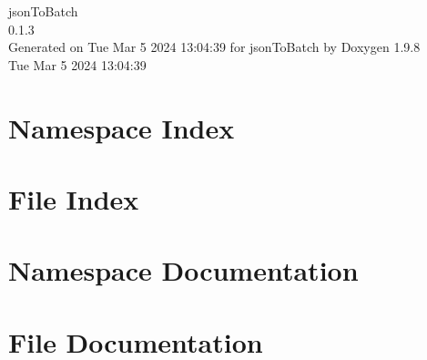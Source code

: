 \documentclass[twoside]{book}
\newcommand{\+}{\discretionary{\mbox{\scriptsize$\hookleftarrow$}}{}{}}
\newcommand{\clearemptydoublepage}{%
    \newpage{\pagestyle{empty}\cleardoublepage}%
  }
\begin{document}
  \raggedbottom
    \hypersetup{pageanchor=false,
                bookmarksnumbered=true,
                pdfencoding=unicode
               }
  \begin{titlepage}
  \vspace*{7cm}
  \begin{center}%
  {\Large json\+To\+Batch}\\
  [1ex]\large 0.\+1.\+3 \\
  \vspace*{1cm}
  {\large Generated on Tue Mar 5 2024 13\+:04\+:39 for json\+To\+Batch by Doxygen 1.9.8}\\
    \vspace*{0.5cm}
    {\small Tue Mar 5 2024 13:04:39}
  \end{center}
  \end{titlepage}
  \clearemptydoublepage
  \tableofcontents
  \clearemptydoublepage
  \hypersetup{pageanchor=true}




\chapter{Namespace Index}

\chapter{File Index}

\chapter{Namespace Documentation}

\chapter{File Documentation}






  \backmatter
  \newpage
  \clearemptydoublepage
  \printindex
\end{document}
